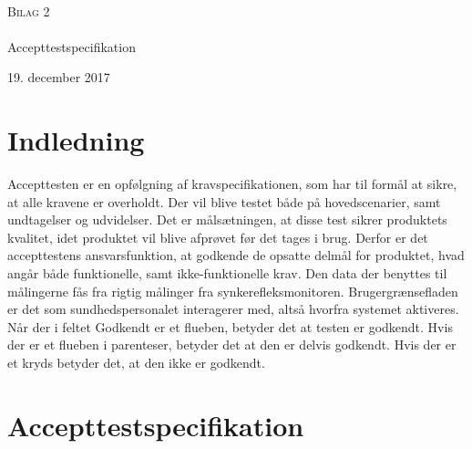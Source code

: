 

\begin{titlingpage}
\begin{center}

~ \\[3cm]


\textsc{\LARGE Bilag 2}\\[1.5cm]


\noindent\makebox[\linewidth]{\rule{\textwidth}{0.4pt}}\\
[0.5cm]{\Huge Accepttestspecifikation}
\noindent\makebox[\linewidth]{\rule{\textwidth}{0.4pt}}
\end{center}
\vfill
\begin{center}
{\large 19. december 2017}
\end{center}
\end{titlingpage}

\newpage
\tableofcontents*


\chapter{Indledning}
Accepttesten er en opfølgning af kravspecifikationen, som har til formål at sikre, at alle kravene er overholdt. Der vil blive testet både på hovedscenarier, samt undtagelser og udvidelser. Det er målsætningen, at disse test sikrer produktets kvalitet, idet produktet vil blive afprøvet før det tages i brug. Derfor er det accepttestens ansvarsfunktion, at godkende de opsatte delmål for produktet, hvad angår både funktionelle, samt ikke-funktionelle krav.
Den data der benyttes til målingerne fås fra rigtig målinger fra synkerefleksmonitoren. Brugergrænsefladen er det som sundhedspersonalet interagerer med, altså hvorfra systemet
aktiveres. Når der i feltet Godkendt er et flueben, betyder det at testen er godkendt. Hvis der er et flueben i parenteser, betyder det at den er delvis godkendt. Hvis der er et kryds betyder
det, at den ikke er godkendt.










\chapter{Accepttestspecifikation}

